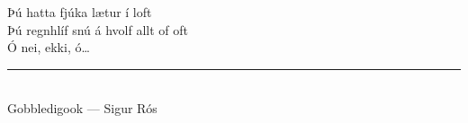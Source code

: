 \documentclass{article}
\begin{document}
\noindent\LARGE
Þú hatta fjúka lætur í loft\\
Þú regnhlíf snú á hvolf allt of oft\\
Ó nei, ekki, ó…\\
\hrule~\\[0.5cm]
Gobbledigook — Sigur Rós
\end{document}

